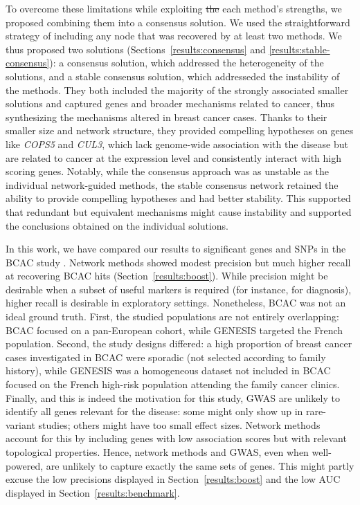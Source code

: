 \documentclass[10pt,letterpaper]{article}
\providecommand{\DIFdeltex}[1]{{\protect\color{red}\sout{#1}}}                      %
\providecommand{\DIFdelbegin}{} %
\providecommand{\DIFdelend}{} %
\providecommand{\DIFdel}[1]{\texorpdfstring{\DIFdeltex{#1}}{}} %
\newcommand{\DIFscaledelfig}{0.5}
\newlength{\DIFdelgraphicswidth} %
\newlength{\DIFdelgraphicsheight} %
\newcommand{\DIFdelincludegraphics}[2][]{%
\sbox{\DIFdelgraphicsbox}{\DIFOincludegraphics[#1]{#2}}%
\settoboxwidth{\DIFdelgraphicswidth}{\DIFdelgraphicsbox} %
\settoboxtotalheight{\DIFdelgraphicsheight}{\DIFdelgraphicsbox} %
\scalebox{\DIFscaledelfig}{%
\parbox[b]{\DIFdelgraphicswidth}{\usebox{\DIFdelgraphicsbox}\\[-\baselineskip] \rule{\DIFdelgraphicswidth}{0em}}\llap{\resizebox{\DIFdelgraphicswidth}{\DIFdelgraphicsheight}{%
\setlength{\unitlength}{\DIFdelgraphicswidth}%
\begin{picture}(1,1)%
\thicklines\linethickness{2pt} %
{\color[rgb]{1,0,0}\put(0,0){\framebox(1,1){}}}%
{\color[rgb]{1,0,0}\put(0,0){\line( 1,1){1}}}%
{\color[rgb]{1,0,0}\put(0,1){\line(1,-1){1}}}%
\end{picture}%
}\hspace*{3pt}}} %
} %
\DeclareRobustCommand{\DIFdelbegin}{\DIFOdelbegin \let\includegraphics\DIFdelincludegraphics} %
\DeclareRobustCommand{\DIFdelend}{\DIFOaddend \let\includegraphics\DIFOincludegraphics} %
\begin{document}
To overcome these limitations while exploiting \DIFdelbegin \DIFdel{the }\DIFdelend each method's strengths, we proposed combining them into a consensus solution. We used the straightforward strategy of including any node that was recovered by at least two methods. We thus proposed two solutions (Sections~\ref{results:consensus} and \ref{results:stable-consensus}): a consensus solution, which addressed the heterogeneity of the solutions, and a stable consensus solution, which addresseded the instability of the methods. They both included the majority of the strongly associated smaller solutions and captured genes and broader mechanisms related to cancer, thus synthesizing the mechanisms altered in breast cancer cases. Thanks to their smaller size and network structure, they provided compelling hypotheses on genes like \emph{COPS5} and \emph{CUL3}, which lack genome-wide association with the disease but are related to cancer at the expression level and consistently interact with high scoring genes. Notably, while the consensus approach was as unstable as the individual network-guided methods, the stable consensus network retained the ability to provide compelling hypotheses and had better stability. This supported that redundant but equivalent mechanisms might cause instability and supported the conclusions obtained on the individual solutions.

In this work, we have compared our results to significant genes and SNPs in the BCAC study \cite{Michailidou2017}. Network methods showed modest precision but much higher recall at recovering BCAC hits (Section~\ref{results:boost}). While precision might be desirable when a subset of useful markers is required (for instance, for diagnosis), higher recall is desirable in exploratory settings. Nonetheless, BCAC was not an ideal ground truth. First, the studied populations are not entirely overlapping: BCAC focused on a pan-European cohort, while GENESIS targeted the French population. Second, the study designs differed: a high proportion of breast cancer cases investigated in BCAC were sporadic (not selected according to family history), while GENESIS was a homogeneous dataset not included in BCAC focused on the French high-risk population attending the family cancer clinics. Finally, and this is indeed the motivation for this study, GWAS are unlikely to identify all genes relevant for the disease: some might only show up in rare-variant studies; others might have too small effect sizes. Network methods account for this by including genes with low association scores but with relevant topological properties. Hence, network methods and GWAS, even when well-powered, are unlikely to capture exactly the same sets of genes. This might partly excuse the low precisions displayed in Section~\ref{results:boost} and the low AUC displayed in Section~\ref{results:benchmark}.
\end{document}
